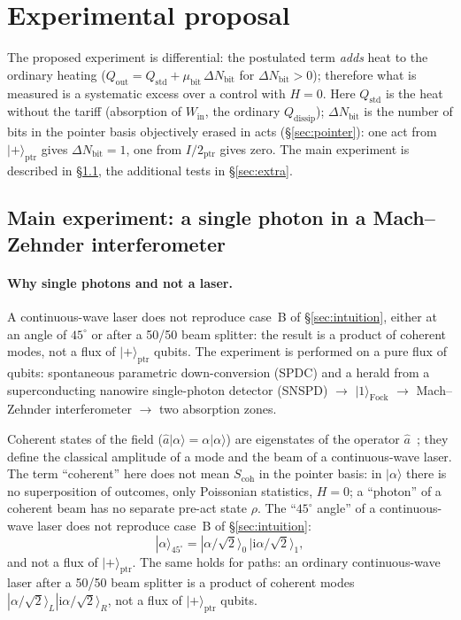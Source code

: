 \documentclass[11pt,a4paper]{article}
\newcommand{\Sref}[1]{\hyperref[#1]{\S\ref{#1}}}
\begin{document}
\section{Experimental proposal}\label{sec:experiment}

The proposed experiment is differential: the postulated term \emph{adds} heat to the ordinary heating ($Q_{\mathrm{out}} = Q_{\mathrm{std}} + \mu_{\mathrm{bit}}\,\Delta N_{\mathrm{bit}}$ for $\Delta N_{\mathrm{bit}} > 0$); therefore what is measured is a systematic excess over a control with $H=0$. Here $Q_{\mathrm{std}}$ is the heat without the tariff (absorption of $W_{\mathrm{in}}$, the ordinary $Q_{\mathrm{dissip}}$); $\Delta N_{\mathrm{bit}}$ is the number of bits in the pointer basis objectively erased in acts (\Sref{sec:pointer}): one act from $|{+}\rangle_{\mathrm{ptr}}$ gives $\Delta N_{\mathrm{bit}}=1$, one from $I/2_{\mathrm{ptr}}$ gives zero. The main experiment is described in \Sref{sec:mz}, the additional tests in \Sref{sec:extra}.

\subsection{Main experiment: a single photon in a Mach--Zehnder interferometer}\label{sec:mz}

\paragraph{Why single photons and not a laser.}
A continuous-wave laser does not reproduce case~B of \Sref{sec:intuition}, either at an angle of $45^\circ$ or after a 50/50 beam splitter: the result is a product of coherent modes, not a flux of $|{+}\rangle_{\mathrm{ptr}}$ qubits. The experiment is performed on a pure flux of qubits: spontaneous parametric down-conversion (SPDC) and a herald from a superconducting nanowire single-photon detector (SNSPD) $\to$ $|1\rangle_{\mathrm{Fock}}$ $\to$ Mach--Zehnder interferometer $\to$ two absorption zones.

Coherent states of the field ($\hat a|\alpha\rangle=\alpha|\alpha\rangle$) are eigenstates of the operator $\hat a$~\cite{glauber1963}; they define the classical amplitude of a mode and the beam of a continuous-wave laser. The term ``coherent'' here does not mean $S_{\mathrm{coh}}$ in the pointer basis: in $|\alpha\rangle$ there is no superposition of outcomes, only Poissonian statistics, $H=0$; a ``photon'' of a coherent beam has no separate pre-act state $\rho$. The ``$45^\circ$ angle'' of a continuous-wave laser does not reproduce case~B of \Sref{sec:intuition}:
\begin{equation}
|\alpha\rangle_{45^\circ} = |\alpha/\sqrt{2}\rangle_{0}\,|\mathrm{i}\alpha/\sqrt{2}\rangle_{1},
\end{equation}
and not a flux of $|{+}\rangle_{\mathrm{ptr}}$. The same holds for paths: an ordinary continuous-wave laser after a 50/50 beam splitter is a product of coherent modes $|\alpha/\sqrt{2}\rangle_L|\mathrm{i}\alpha/\sqrt{2}\rangle_R$, not a flux of $|{+}\rangle_{\mathrm{ptr}}$ qubits.
\end{document}
